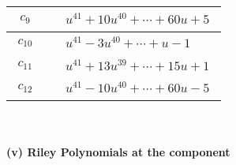 \documentclass[1p]{elsarticle_modified}
\theoremstyle{definition}
\begin{document}
\begin{tabular}{m{50pt}|m{274pt}}
\hline $$\begin{aligned}c_{9}\end{aligned}$$&$\begin{aligned}
&u^{41}+10 u^{40}+\cdots+60 u+5
\end{aligned}$\\
\hline $$\begin{aligned}c_{10}\end{aligned}$$&$\begin{aligned}
&u^{41}-3 u^{40}+\cdots+u-1
\end{aligned}$\\
\hline $$\begin{aligned}c_{11}\end{aligned}$$&$\begin{aligned}
&u^{41}+13 u^{39}+\cdots+15 u+1
\end{aligned}$\\
\hline $$\begin{aligned}c_{12}\end{aligned}$$&$\begin{aligned}
&u^{41}-10 u^{40}+\cdots+60 u-5
\end{aligned}$\\
\hline
\end{tabular}\\~\\
\newpage\renewcommand{\arraystretch}{1}
\flushleft \textbf{(v) Riley Polynomials at the component}\newline \\
\end{document}
